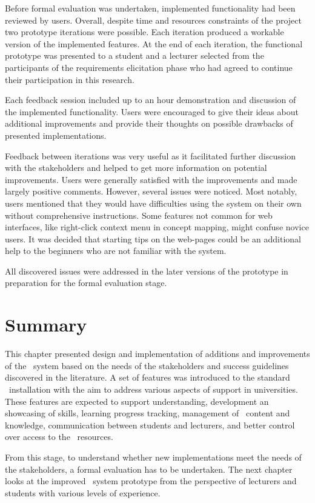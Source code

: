 Before formal evaluation was undertaken, implemented functionality had been
reviewed by users. Overall, despite time and resources constraints of the
project two prototype iterations were possible. Each iteration produced a
workable version of the implemented features. At the end of each iteration, the
functional prototype was presented to a student and a lecturer selected from the
participants of the requirements elicitation phase who had agreed to continue
their participation in this research.

Each feedback session included up to an hour demonstration and discussion of the
implemented functionality. Users were encouraged to give their ideas about
additional improvements and provide their thoughts on possible drawbacks of
presented implementations.

Feedback between iterations was very useful as it facilitated further discussion
with the stakeholders and helped to get more information on potential
improvements. Users were generally satisfied with the improvements and made
largely positive comments. However, several issues were noticed. Most notably,
users mentioned that they would have difficulties using the system on their
own without comprehensive instructions. Some features not common for web
interfaces, like right-click context menu in concept mapping, might confuse
novice users. It was decided that starting tips on the web-pages could be an
additional help to the beginners who are not familiar with the system.

All discovered issues were addressed in the later versions of the prototype
in preparation for the formal evaluation stage.

\section{Summary}

This chapter presented design and implementation of additions and improvements
of the \ep~system based on the needs of the stakeholders and \LLLs success
guidelines discovered in the literature. A set of features was introduced to
the standard \ep~installation with the aim to address various aspects of \LLLs
support in universities. These features are expected to support understanding,
development an showcasing of \LLLs skills, learning progress tracking,
management of \ep~content and knowledge, communication between students and
lecturers, and better control over access to the \ep~resources.

From this stage, to understand whether new implementations meet the needs of
the stakeholders, a formal evaluation has to be undertaken. The next chapter
looks at the improved \ep~system prototype from the perspective of lecturers
and students with various levels of experience.
